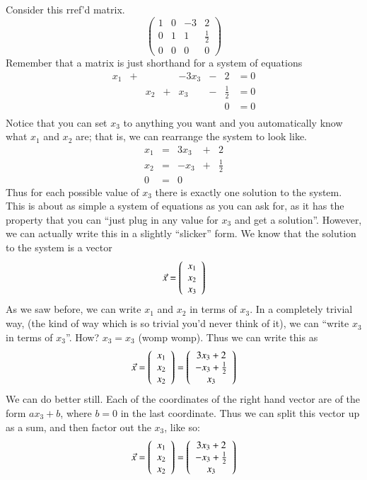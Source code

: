 \begin{Example}
  \label{sec:gaussexamp}
  Consider this rref'd matrix.
  \[\left(\begin{array}{cccc}
      1 & 0 & -3 &  2\\
      0 & 1 & 1  &  \frac{1}{2}\\
      0 & 0 & 0 & 0
    \end{array}\right)\]
  Remember that a matrix is just shorthand for a system of equations
  \[\begin{array}{cccccccc}
    x_1 & + & & & -3x_3 & - &  2 & = 0\\
    & & x_2& + & x_3 & - &  \frac{1}{2} & = 0\\
    & & & &&  &  0 & = 0\\
  \end{array}\]
  Notice that you can set $x_3$ to anything you want and you automatically know what $x_1$ and $x_2$ are; that is, we can rearrange the system to look like.
  \[\begin{array}{cccccccc}
    x_1 & = & 3x_3 & + &  2\\
    x_2& = & -x_3 & + &  \frac{1}{2}\\
    0 &=&0
  \end{array}\]
  Thus for each possible value of $x_3$ there is exactly one solution to the system.  
  This is about as simple a system of equations as you can ask for, as it has the property that you can ``just plug in any value for $x_3$ and get a solution''.  
  However, we can actually write this in a slightly ``slicker'' form.
  We know that the solution to the system is a vector 
  \[\vec{x}=\left(\begin{array}{c}x_1 \\ x_2 \\ x_3\end{array}\right)\]
  As we saw before, we can write $x_1$ and $x_2$ in terms of $x_3$.  
  In a completely trivial way, (the kind of way which is so trivial you'd never think of it), we can ``write $x_3$ in terms of $x_3$''.  
  How?  $x_3=x_3$ (womp womp).  
  Thus we can write this as
  \[\vec{x}=\left(\begin{array}{c}x_1 \\ x_2 \\ x_2\end{array}\right)= \left(\begin{array}{c}3x_3+2 \\ -x_3+\frac{1}{2} \\ x_3\end{array}\right)\]
  We can do better still.  
  Each of the coordinates of the right hand vector are of the form $ax_3+b$, where $b=0$ in the last coordinate.  
  Thus we can split this vector up as a sum, and then factor out the $x_3$, like so:
  \[\vec{x}=\left(\begin{array}{c}x_1 \\ x_2 \\ x_2\end{array}\right)= \left(\begin{array}{c}3x_3+2 \\ -x_3+\frac{1}{2} \\ x_3\end{array}\right)
\]
\end{Example}
